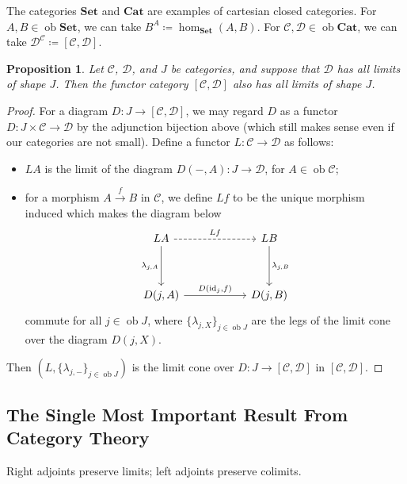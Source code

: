 \documentclass[a4paper,11pt]{article}
\theoremstyle{break_italics}
\newtheorem*{proposition*}{Proposition}
\theoremstyle{break_upright}
\theoremstyle{remark}
\newcommand{\id}{\mathrm{id}}
\newcommand{\ob}{\operatorname{ob}}
\newcommand{\C}{\mathcal{C}}
\newcommand{\D}{\mathcal{D}}
\newcommand{\Set}{\mathbf{Set}}
\begin{document}
The categories $\Set$ and $\mathbf{Cat}$ are examples of cartesian closed categories. For $A, B \in \ob\Set$, we can take $B^A \coloneqq \hom_\Set(A, B)$. For $\C,\D \in \ob\mathbf{Cat}$, we can take $\D^\C \coloneqq [\C,\D]$.

\begin{proposition*}
	Let $\C$, $\D$, and $J$ be categories, and suppose that $\D$ has all limits of shape $J$. Then the functor category $[\C,\D]$ also has all limits of shape $J$.
\end{proposition*}
\begin{proof}
	For a diagram $D \colon J \to [\C,\D]$, we may regard $D$ as a functor $D \colon J \times \C \to \D$ by the adjunction bijection above (which still makes sense even if our categories are not small). Define a functor $L \colon \C \to \D$ as follows:
	\begin{itemize}
		\item $LA$ is the limit of the diagram $D(-, A) \colon J \to \D$, for $A \in \ob\C$;
		\item for a morphism $A \xrightarrow{f} B$ in $\C$, we define $Lf$ to be the unique morphism induced which makes the diagram below
\[\begin{tikzcd}
	LA && LB \\
	\\
	{D(j,A)} & {} & {D(j,B)}
	\arrow["{Lf}", dashed, from=1-1, to=1-3]
	\arrow["{\lambda_{j,A}}"', from=1-1, to=3-1]
	\arrow["{\lambda_{j,B}}", from=1-3, to=3-3]
	\arrow["{D(\id_j, f)}", from=3-1, to=3-3]
\end{tikzcd}\]
			commute for all $j \in \ob J$, where $\{\lambda_{j,X}\}_{j\in\ob J}$ are the legs of the limit cone over the diagram $D(j,X)$.
	\end{itemize}
	Then $(L, \{\lambda_{j,-}\}_{j\in\ob J})$ is the limit cone over $D \colon J \to [\C,\D]$ in $[\C,\D]$.
\end{proof}







\subsection{The Single Most Important Result From Category Theory}

Right adjoints preserve limits; left adjoints preserve colimits.
\end{document}
